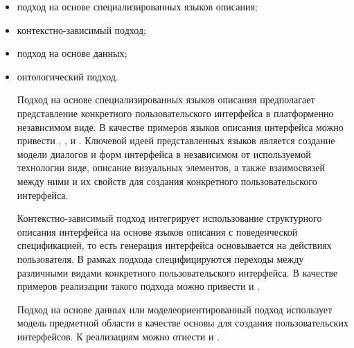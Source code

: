 \begin{SCn}
	
\scnsectionheader{\currentname}
	
\scnstartsubstruct
	
\begin{itemize}
	\item подход на основе специализированных языков описания;
	\item контекстно-зависимый подход;
	\item подход на основе данных;
	\item онтологический подход.	

Подход на основе специализированных языков описания предполагает представление конкретного пользовательского интерфейса в платформенно независимом виде. В качестве примеров языков описания интерфейса можно привести , ,  и . Ключевой идеей представленных языков является создание модели диалогов и форм интерфейса в независимом от используемой технологии виде, описание визуальных элементов, а также взаимосвязей между ними и их свойств для создания конкретного пользовательского интерфейса.

Контекстно-зависимый подход интегрирует использование структурного описания интерфейса на основе языков описания с поведенческой спецификацией, то есть генерация интерфейса основывается на действиях пользователя. В рамках подхода специфицируются переходы между различными видами конкретного пользовательского интерфейса. В качестве примеров реализации такого подхода можно привести  и .

Подход на основе данных или моделеориентированный подход использует модель предметной области в качестве основы для создания пользовательских интерфейсов. К реализациям можно отнести  и .


\end{itemize}
\end{SCn}

